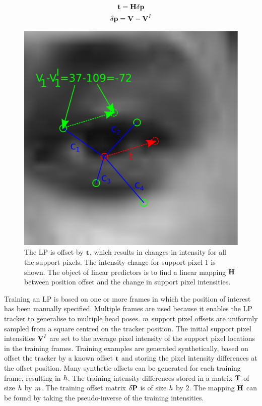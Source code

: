 \begin{appendices}
\begin{gather}
\label{LinearPredictionMapping}
\textbf{t} = \textbf{H} \delta \textbf{p} \\
\label{LinearPredictionIntensity}
\delta \textbf{p} = \textbf{V} - \textbf{V}^I
\end{gather}

\begin{figure}[tb]
\centering
\includegraphics[width = 0.5 \columnwidth]{litreview/lptracker2.pdf}
\caption[The \ac{LP} is offset by $\predictedMotion$, which results in changes in intensity for all the support pixels.]{The \ac{LP} is offset by $\predictedMotion$, which results in changes in intensity for all the support pixels. The intensity change for support pixel 1 is shown. The object of linear predictors is to find a linear mapping $\textbf{H}$ between position offset and the change in support pixel intensities.}
\label{FigureLinearPredictorOffset}
\end{figure}

Training an \ac{LP} is based on one or more frames in which the position of interest has been manually specified. Multiple frames are used because it enables the \ac{LP} tracker to generalise to multiple head poses. $m$ support pixel offsets are uniformly sampled from a square centred on the tracker position. The initial support pixel intensities $\textbf{V}^I$ are set to the average pixel intensity of the support pixel locations in the training frames. Training examples are generated synthetically, based on offset the tracker by a known offset $\predictedMotion$ and storing the pixel intensity differences at the offset position. Many synthetic offsets can be generated for each training frame, resulting in $h$. The training intensity differences stored in a matrix $\textbf{T}$ of size $h$ by $m$. The training offset matrix $\delta \textbf{P}$ is of size $h$ by $2$. The mapping $\textbf{H}$ can be found by taking the pseudo-inverse of the training intensities.


\end{appendices}
